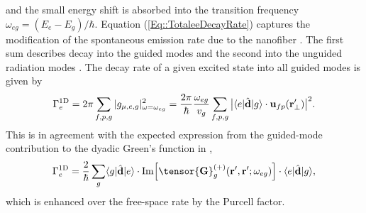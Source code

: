 \documentclass[preprint, aps,pra,onecolumn]{revtex4-1} %
\newcommand{\oneD}{{\rm 1D}}
\begin{document}
and the small energy shift is absorbed into the transition frequency $\omega_{eg} = (E_e - E_g)/\hbar$.  
Equation (\ref{Eq::TotaleeDecayRate}) captures the modification of the spontaneous emission rate due to the nanofiber \cite{le_kien_spontaneous_2005}.  
The first sum describes decay into the guided modes and the second into the unguided radiation modes \cite{ nha_cavity_1997,klimov_spontaneous_2004,le_kien_spontaneous_2005,maslov_distribution_2006, scheel_directional_2015}. The decay rate of a given excited state into all guided modes is given by
	\begin{equation}
		\Gamma_e^{\oneD}= 2\pi \sum_{f,p,g} |g_{\mu,e,g} |^2_{\omega = \omega_{eg}} =  \frac{ 2\pi }{\hbar} \frac{ \omega_{eg} }{v_g} \sum_{f,p,g} \big|\bra{e}\hat{\mathbf{d}}\ket{g} \cdot \mathbf{u}_{fp}(\br'_\perp)\big|^2  .
	\end{equation}
This is in agreement with the expected expression from the guided-mode contribution to the dyadic Green's function in ,
	\begin{equation} \label{Eq::Gamma1DGreens}
		\Gamma_e^{\oneD} =  \frac{2}{\hbar} \sum_{g}  \bra{g}\hat{\mathbf{d}}\ket{e}\cdot 
{\rm Im} \Big[\tensor{\mathbf{G}}^{(+)}_g(\br', \br'; \omega_{eg} ) \Big] \cdot \bra{e}\hat{\mathbf{d}}\ket{g},
	\end{equation}
which is enhanced over the free-space rate by the Purcell factor. 
\end{document}
